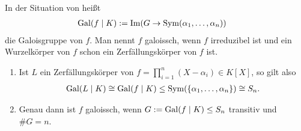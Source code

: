 \begin{definition}
	In der Situation von  heißt \begin{align*}
		\operatorname{Gal}(f\mid K) &:= \operatorname{Im} (G\to\operatorname{Sym}(\alpha_1,\dots,\alpha_n))
	\end{align*}
	die Galoisgruppe von $f$. Man nennt $f$ galoissch, wenn $f$ irreduzibel ist und ein Wurzelkörper von $f$ schon ein Zerfällungskörper von $f$ ist.
\end{definition}

\begin{remark}
	\begin{enumerate}[topsep=0pt,label={(\alph*)}]
		\item Ist $L$ ein Zerfällungskörper von $f=\prod_{i=1}^n (X-\alpha_i)\in K[X]$, so gilt also \begin{align*}
			\operatorname{Gal}(L\mid K) \cong \operatorname{Gal}(f\mid K) \le \operatorname{Sym}(\lbrace \alpha_1,\dots,\alpha_n\rbrace) \cong S_n.
		\end{align*}
		\item Genau dann ist $f$ galoissch, wenn $G:= \operatorname{Gal}(f\mid K) \le S_n$ transitiv und $\# G = n$.
	\end{enumerate}
\end{remark}

